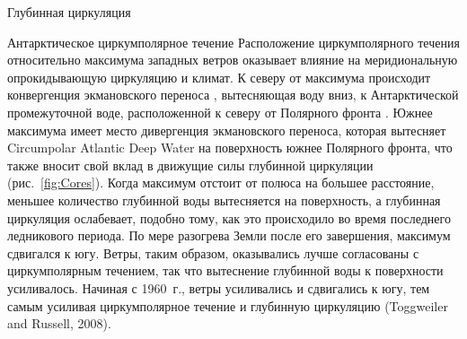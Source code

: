 \begin{chapter}{Глубинная циркуляция}
\begin{section}{Антарктическое циркумполярное течение}
Расположение циркумполярного течения относительно максимума западных ветров
оказывает влияние на меридиональную опрокидывающую циркуляцию и климат.
К северу от максимума происходит конвергенция экмановского переноса%
, вытесняющая воду вниз, к Антарктической
промежуточной воде, расположенной к северу от Полярного фронта%
. Южнее максимума имеет место дивергенция
экмановского переноса, которая вытесняет Circumpolar Atlantic Deep Water 
на поверхность южнее Полярного фронта, что также вносит свой вклад в 
движущие силы глубинной циркуляции (рис.~\ref{fig:Cores}). Когда максимум отстоит
от полюса на большее расстояние, меньшее количество глубинной воды вытесняется
на поверхность, а глубинная циркуляция ослабевает, подобно тому, как это
происходило во время последнего ледникового периода. По мере разогрева Земли
после его завершения, максимум сдвигался к югу. Ветры, таким образом, 
оказывались лучше согласованы с циркумполярным течением, так что вытеснение
глубинной воды к поверхности усиливалось. Начиная с 1960~г., ветры усиливались
и сдвигались к югу, тем самым усиливая циркумполярное течение и глубинную
циркуляцию (Toggweiler and Russell, 2008).
%


\end{section}
\end{chapter}
